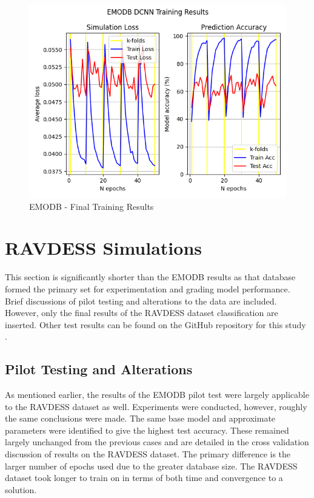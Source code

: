 \begin{figure}[ht]
        \centering
        \includegraphics[scale = 0.6]{images_results/EMODB-FinalResults/EMODB_Results_31-05__15-50.png}
        \caption{EMODB - Final Training Results}
        \label{emodb_final_results}
\end{figure}

\section{RAVDESS Simulations}
This section is significantly shorter than the EMODB results as that database formed the primary set for experimentation and grading model performance. Brief discussions of pilot testing and alterations to the data are included. However, only the final results of the RAVDESS dataset classification are inserted. Other test results can be found on the GitHub repository for this study \cite{Blake_ELEC4840B-Repo}. 

\subsection{Pilot Testing and Alterations}
As mentioned earlier, the results of the EMODB pilot test were largely applicable to the RAVDESS dataset as well. Experiments were conducted, however, roughly the same conclusions were made. The same base model and approximate parameters were identified to give the highest test accuracy. These remained largely unchanged from the previous cases and are detailed in the cross validation  discussion of results on the RAVDESS dataset. The primary difference is the larger number of epochs used due to the greater database size. The RAVDESS dataset took longer to train on in terms of both time and convergence to a solution.


